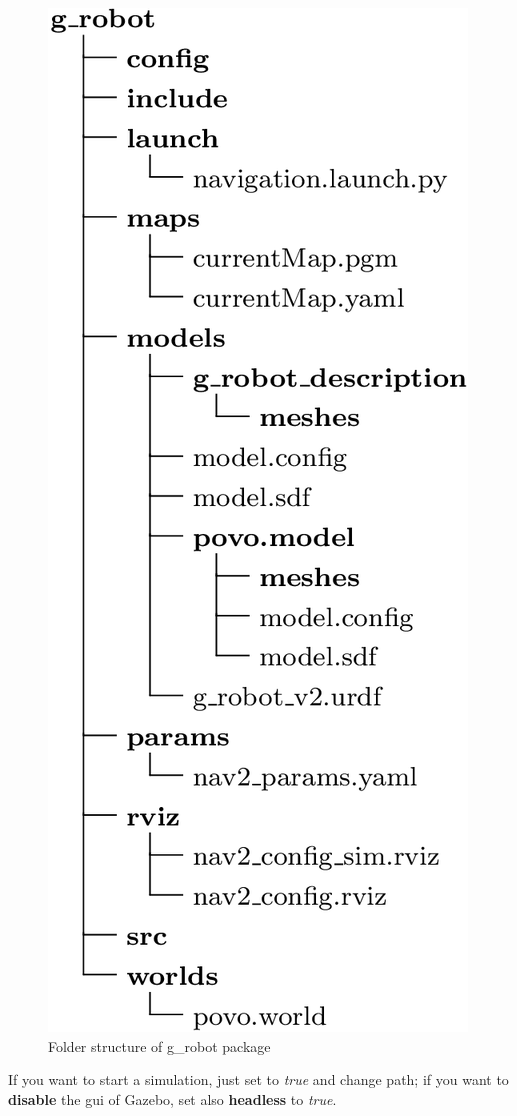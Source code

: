 \begin{figure}[h]
\begin{minipage}[h]{0.3\textwidth}
        \includegraphics[width=\textwidth]{images/g-robot}
        \caption{Folder structure of g\_robot package}
        \label{fig:folder}
    \end{minipage}
\end{figure}

\bigskip

If you want to start a simulation, just set  to \textit{true} and change  path; if you want to \textbf{disable} the \acrfull{gui} of Gazebo, set also \textbf{headless} to \textit{true}.

